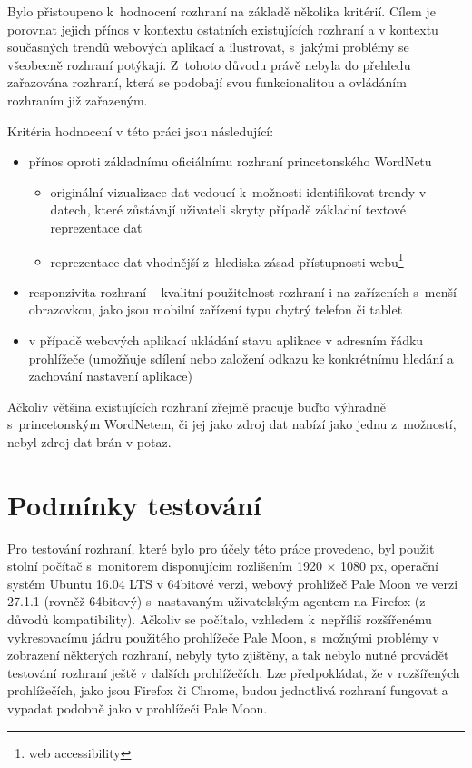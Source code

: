 \documentclass[a4paper, 11pt, oneside, showtrims]{book}
\begin{document}
				Bylo přistoupeno k~hodnocení rozhraní na základě několika kritérií. Cílem je porovnat jejich přínos v kontextu ostatních existujících rozhraní a v kontextu současných trendů webových aplikací a ilustrovat, s~jakými problémy se všeobecně rozhraní potýkají.  Z~tohoto důvodu právě nebyla do přehledu zařazována rozhraní, která se podobají svou funkcionalitou a ovládáním rozhraním již zařazeným. 

				Kritéria hodnocení v této práci jsou následující:

					\begin{itemize}
						\item přínos oproti základnímu oficiálnímu rozhraní princetonského WordNetu
							\begin{itemize}
								\item originální vizualizace dat vedoucí k~možnosti identifikovat trendy v datech, které zůstávají uživateli skryty případě základní textové reprezentace dat
								\item reprezentace dat vhodnější z~hlediska zásad přístupnosti webu\footnote{web accessibility}
							\end{itemize}
						\item responzivita rozhraní -- kvalitní použitelnost rozhraní i na zařízeních s~menší obrazovkou, jako jsou mobilní zařízení typu chytrý telefon či tablet
						\item v případě webových aplikací ukládání stavu aplikace v adresním řádku prohlížeče (umožňuje sdílení nebo založení odkazu ke konkrétnímu hledání a zachování nastavení aplikace)
					\end{itemize}

				Ačkoliv většina existujících rozhraní zřejmě pracuje buďto výhradně s~princetonským WordNetem, či jej jako zdroj dat nabízí jako jednu z~možností, nebyl zdroj dat brán v potaz.

			\section{Podmínky testování}

				Pro testování rozhraní, které bylo pro účely této práce provedeno, byl použit stolní počítač s~monitorem disponujícím rozlišením 1920 × 1080 px, operační systém Ubuntu 16.04 LTS v 64bitové verzi, webový prohlížeč Pale Moon ve verzi 27.1.1 (rovněž 64bitový) s~nastavaným uživatelským agentem na Firefox (z důvodů kompatibility). Ačkoliv se počítalo, vzhledem k~nepříliš rozšířenému vykresovacímu jádru použitého prohlížeče Pale Moon, s~možnými problémy v zobrazení některých rozhraní, nebyly tyto zjištěny, a tak nebylo nutné provádět testování rozhraní ještě v dalších prohlížečích. Lze předpokládat, že v rozšířených prohlížečích, jako jsou Firefox či Chrome, budou jednotlivá rozhraní fungovat a vypadat podobně jako v prohlížeči Pale Moon.
\end{document}
